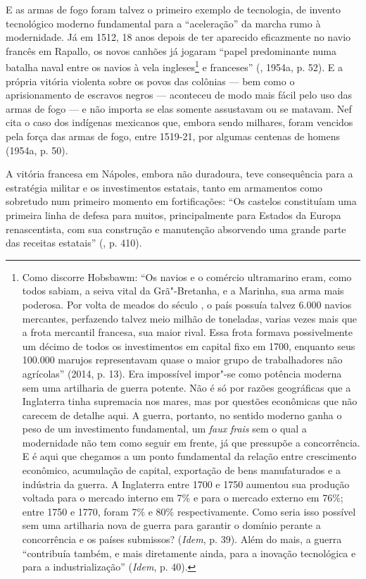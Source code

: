 E as armas de fogo foram talvez o primeiro exemplo de tecnologia, de
invento tecnológico moderno fundamental para a ``aceleração'' da marcha
rumo à modernidade. Já em 1512, 18 anos depois de ter aparecido
eficazmente no navio francês em Rapallo, os novos canhões já jogaram
``papel predominante numa batalha naval entre os navios à vela
ingleses\footnote{Como discorre Hobsbawm: ``Os navios e o comércio ultramarino eram,
  como todos sabiam, a seiva vital da Grã"-Bretanha, e a Marinha, sua
  arma mais poderosa. Por volta de meados do século , o país
  possuía talvez 6.000 navios mercantes, perfazendo talvez meio milhão
  de toneladas, varias vezes mais que a frota mercantil francesa, sua
  maior rival. Essa frota formava possivelmente um décimo de todos os
  investimentos em capital fixo em 1700, enquanto seus 100.000 marujos
  representavam quase o maior grupo de trabalhadores não agrícolas''
  (2014, p. 13). Era impossível impor"-se como potência moderna sem uma
  artilharia de guerra potente. Não é só por razões geográficas que a
  Inglaterra tinha supremacia nos mares, mas por questões econômicas que
  não carecem de detalhe aqui. A guerra, portanto, no sentido moderno
  ganha o peso de um investimento fundamental, um \emph{faux}
  \emph{frais} sem o qual a modernidade não tem como seguir em frente,
  já que pressupõe a concorrência. E é aqui que chegamos a um ponto
  fundamental da relação entre crescimento econômico, acumulação de
  capital, exportação de bens manufaturados e a indústria da guerra. A
  Inglaterra entre 1700 e 1750 aumentou sua produção voltada para o
  mercado interno em 7\% e para o mercado externo em 76\%; entre 1750 e
  1770, foram 7\% e 80\% respectivamente. Como seria isso possível sem
  uma artilharia nova de guerra para garantir o domínio perante a
  concorrência e os países submissos? (\emph{Idem}, p. 39). Além do
  mais, a guerra ``contribuía também, e mais diretamente ainda, para a
  inovação tecnológica e para a industrialização'' (\emph{Idem}, p.
  40).} e franceses'' (, 1954a, p. 52). E a própria vitória
violenta sobre os povos das colônias --- bem como o aprisionamento de
escravos negros --- aconteceu de modo mais fácil pelo uso das armas de
fogo --- e não importa se elas somente assustavam ou se matavam. Nef cita
o caso dos indígenas mexicanos que, embora sendo milhares, foram
vencidos pela força das armas de fogo, entre 1519-21, por algumas
centenas de homens (1954a, p. 50).

A vitória francesa em Nápoles, embora não duradoura, teve consequência
para a estratégia militar e os investimentos estatais, tanto em
armamentos como sobretudo num primeiro momento em fortificações: ``Os
castelos constituíam uma primeira linha de defesa para muitos,
principalmente para Estados da Europa renascentista, com sua construção
e manutenção absorvendo uma grande parte das receitas estatais''
(, p. 410).

